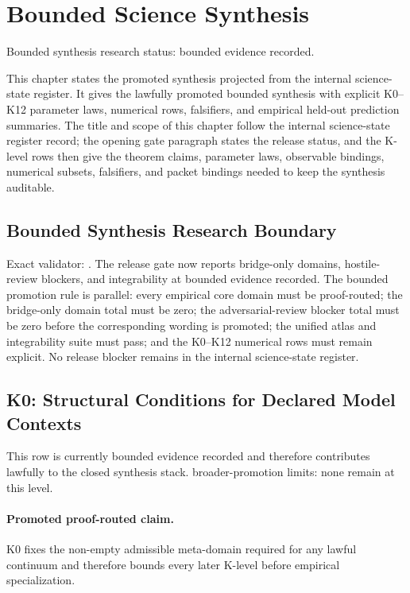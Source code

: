 \section{Bounded Science Synthesis}
\label{sec:oc-core-1-3-unified-synthesis}
Bounded synthesis research status: bounded evidence recorded.

This chapter states the promoted synthesis projected from the internal science-state register. It gives the lawfully promoted bounded synthesis with explicit K0--K12 parameter laws, numerical rows, falsifiers, and empirical held-out prediction summaries.
The title and scope of this chapter follow the internal science-state register record; the opening gate paragraph states the release status, and the K-level rows then give the theorem claims, parameter laws, observable bindings, numerical subsets, falsifiers, and packet bindings needed to keep the synthesis auditable.

\subsection{Bounded Synthesis Research Boundary}
Exact validator: .
The release gate now reports  bridge-only domains,  hostile-review blockers, and integrability at bounded evidence recorded.
The bounded promotion rule is parallel: every empirical core domain must be proof-routed; the bridge-only domain total must be zero; the adversarial-review blocker total must be zero before the corresponding wording is promoted; the unified atlas and integrability suite must pass; and the K0--K12 numerical rows must remain explicit.
No release blocker remains in the internal science-state register.

\subsection{K0: Structural Conditions for Declared Model Contexts}
\label{sec:oc-core-1-3-synthesis-k0}
This row is currently bounded evidence recorded and therefore contributes lawfully to the closed synthesis stack.
broader-promotion limits: none remain at this level.

\paragraph{Promoted proof-routed claim.}
K0 fixes the non-empty admissible meta-domain required for any lawful continuum and therefore bounds every later K-level before empirical specialization.

